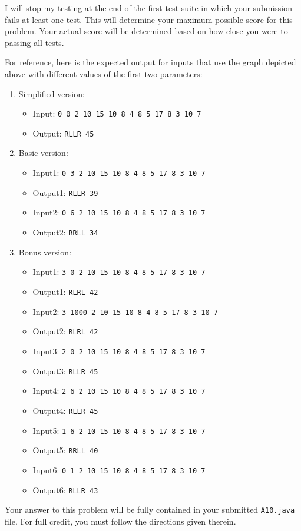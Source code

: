 \documentclass[12pt]{article}
\begin{document}
\begin{enumerate}
{I will stop my testing at the end of the first test suite in which
your submission fails at least one test. This will determine your
maximum possible score for this problem.  Your actual score will be
determined based on how close you were to passing all tests.

For reference, here is the expected output for inputs that use the
graph depicted above with different values of the first two parameters:

\begin{enumerate}
\item Simplified version:
  \begin{itemize}
  \item Input: \verb+0 0 2 10 15 10 8 4 8 5 17 8 3 10 7+
  \item Output: \verb+RLLR 45+
  \end{itemize}
\item Basic version:
  \begin{itemize}
  \item Input1: \verb+0 3 2 10 15 10 8 4 8 5 17 8 3 10 7+
  \item Output1: \verb+RLLR 39+
  \item Input2: \verb+0 6 2 10 15 10 8 4 8 5 17 8 3 10 7+
  \item Output2: \verb+RRLL 34+
  \end{itemize}
\item Bonus version:
  \begin{itemize}
  \item Input1: \verb+3 0 2 10 15 10 8 4 8 5 17 8 3 10 7+
  \item Output1: \verb+RLRL 42+
  \item Input2: \verb+3 1000 2 10 15 10 8 4 8 5 17 8 3 10 7+
  \item Output2: \verb+RLRL 42+
  \item Input3: \verb+2 0 2 10 15 10 8 4 8 5 17 8 3 10 7+
  \item Output3: \verb+RLLR 45+
  \item Input4: \verb+2 6 2 10 15 10 8 4 8 5 17 8 3 10 7+
  \item Output4: \verb+RLLR 45+
  \item Input5: \verb+1 6 2 10 15 10 8 4 8 5 17 8 3 10 7+
  \item Output5: \verb+RRLL 40+
  \item Input6: \verb+0 1 2 10 15 10 8 4 8 5 17 8 3 10 7+
  \item Output6: \verb+RLLR 43+
  \end{itemize}
\end{enumerate}

Your answer to this problem will be fully contained in your submitted
{\tt A10.java} file. For full credit, you must follow the directions given
therein.
}
\end{enumerate}
\end{document}
